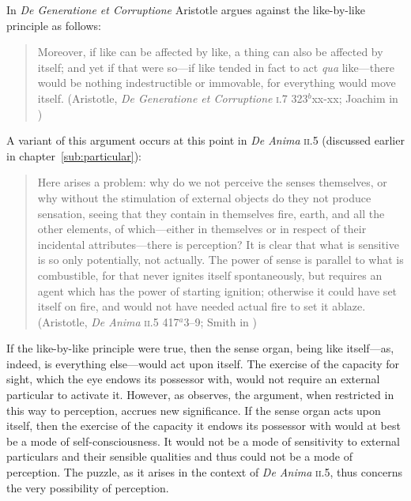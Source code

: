 In \emph{De Generatione et Corruptione} Aristotle argues against the like-by-like principle as follows:
\begin{quote}
	Moreover, if like can be affected by like, a thing can also be affected by itself; and yet if that were so---if like tended in fact to act \emph{qua} like---there would be nothing indestructible or immovable, for everything would move itself. (Aristotle, \emph{De Generatione et Corruptione} \textsc{i}.7 323\( ^{b} \)xx-xx; Joachim in \citealt[23]{Barnes:1984uq})
\end{quote}
A variant of this argument occurs at this point in \emph{De Anima} \textsc{ii}.5 (discussed earlier in chapter~\ref{sub:particular}): 
\begin{quote}
	Here arises a problem: why do we not perceive the senses themselves, or why without the stimulation of external objects do they not produce sensation, seeing that they contain in themselves fire, earth, and all the other elements, of which---either in themselves or in respect of their incidental attributes---there is perception? It is clear that what is sensitive is so only potentially, not actually. The power of sense is parallel to what is combustible, for that never ignites itself spontaneously, but requires an agent which has the power of starting ignition; otherwise it could have set itself on fire, and would not have needed actual fire to set it ablaze. (Aristotle, \emph{De Anima} \textsc{ii}.5 417\( ^{a} \)3--9; Smith in \citealt[29]{Barnes:1984uq})
\end{quote}
If the like-by-like principle were true, then the sense organ, being like itself---as, indeed, is everything else---would act upon itself. The exercise of the capacity for sight, which the eye endows its possessor with, would not require an external particular to activate it. However, as \citet[226--227]{Polansky:2007ly} observes, the argument, when restricted in this way to perception, accrues new significance. If the sense organ acts upon itself, then the exercise of the capacity it endows its possessor with would at best be a mode of self-consciousness. It would not be a mode of sensitivity to external particulars and their sensible qualities and thus could not be a mode of perception. The puzzle, as it arises in the context of \emph{De Anima} \textsc{ii}.5, thus concerns the very possibility of perception.

